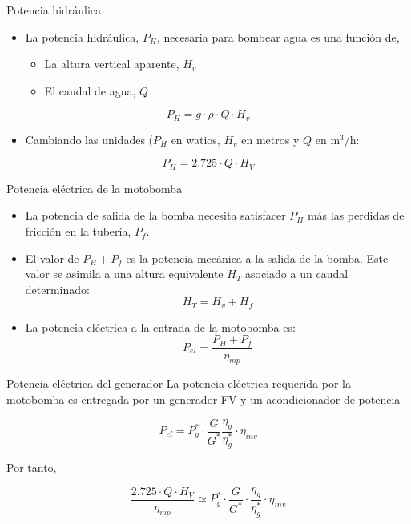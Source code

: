\documentclass[xcolor={usenames,svgnames,dvipsnames}]{beamer}
\begin{document}
\begin{frame}[label={sec:orgb912322}]{Potencia hidráulica}
\begin{itemize}
\item La \alert{potencia hidráulica}, \(P_{H}\), necesaria para bombear agua es una función de,

\begin{itemize}
\item La \alert{altura vertical aparente}, \(H_{v}\)

\item El \alert{caudal de agua}, \(Q\)
\end{itemize}
\end{itemize}

$$P_{H}=g\cdot\rho\cdot Q\cdot H_{v}$$

\begin{itemize}
\item Cambiando las unidades (\(P_{H}\) en watios, \(H_{v}\) en metros y \(Q\) en \(\si{\meter\cubed\per\hour}\):
\end{itemize}
$$P_{H}=2.725\cdot Q\cdot H_{V}$$
\end{frame}

\begin{frame}[label={sec:orgd9781e8}]{Potencia eléctrica de la motobomba}
\begin{itemize}
\item La potencia de salida de la bomba necesita satisfacer \(P_{H}\) más las \alert{perdidas de fricción en la tubería}, \(P_{f}\).

\item El valor de \(P_{H}+P_{f}\) es la \alert{potencia mecánica a la salida de la bomba}. Este valor se asimila a una altura equivalente \(H_{T}\) asociado a un caudal determinado:$$H_{T}=H_{v}+H_{f}$$

\item La \alert{potencia eléctrica a la entrada de la motobomba} es: $$P_{el}=\frac{P_{H}+P_{f}}{\eta_{mp}}$$
\end{itemize}
\end{frame}

\begin{frame}[label={sec:org2dd0c87}]{Potencia eléctrica del generador}
La potencia eléctrica requerida por la motobomba es entregada por un generador FV y un acondicionador de potencia

$$P_{el}=P_{g}^{*}\cdot\frac{G}{G^{*}}\frac{\eta_{g}}{\eta_{g}^{*}}\cdot\eta_{inv}$$

Por tanto,

$$ \frac{2.725\cdot Q\cdot H_{V}}{\eta_{mp}} \simeq P_{g}^{*}\cdot\frac{G}{G^{*}}\cdot\frac{\eta_{g}}{\eta_{g}^{*}}\cdot\eta_{inv}$$ 
\end{frame}
\end{document}
